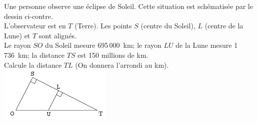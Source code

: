 
\begin{multicols}{2}
Une personne observe une éclipse de
Soleil. Cette situation est schématisée par le dessin ci-contre.\\
L'observateur est en $T$ (Terre). Les points $S$ (centre du Soleil),
$L$ (centre de la Lune) et $T$ sont alignés.\\
Le rayon $SO$ du
Soleil mesure 695\,000~km; le rayon $LU$ de la Lune mesure
1\,736~km; la distance $TS$ est 150 millions de km.\\
Calcule
la distance $TL$ (On donnera l'arrondi au km).\\ 
\includegraphics[scale=1]{TR-exo19.png} 
\end{multicols}
